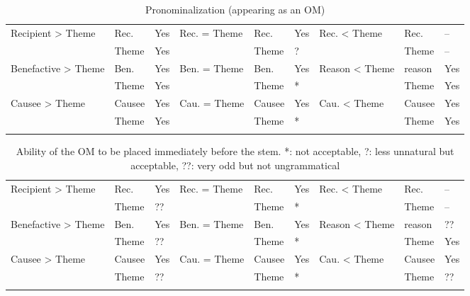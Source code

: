 \documentclass[output=paper,
            colorlinks, citecolor=brown
            ,draftmode
		  ]{langscibook}
\begin{document}
\begin{table}
\small
\begin{tabularx}{\textwidth}{QllQllQll}

\lsptoprule

Recipient > Theme & Rec. & Yes & Rec. = Theme & Rec. & Yes & Rec. < Theme & Rec. & {}--\\
& Theme & Yes &  & Theme & ? &  & Theme & {}--\\
\tablevspace
Benefactive > Theme & Ben. & Yes & Ben. = Theme & Ben. & Yes & Reason < Theme & reason & Yes\\
& Theme & Yes &  & Theme & * &  & Theme & Yes\\
\tablevspace
Causee > Theme & Causee & Yes & Cau. = Theme & Causee & Yes & Cau. < Theme & Causee & Yes\\
& Theme & Yes &  & Theme & * &  & Theme & Yes\\
\lspbottomrule
\end{tabularx}
\caption{Pronominalization (appearing as an OM)}
\label{tab:yoneda:3}
\end{table}

\begin{table}
\small
\begin{tabularx}{\textwidth}{QllQllQll}

\lsptoprule

Recipient > Theme & Rec. & Yes & Rec. = Theme & Rec. & Yes & Rec. < Theme & Rec. & {}--\\
& Theme & ?? &  & Theme & * &  & Theme & {}--\\
\tablevspace
Benefactive > Theme & Ben. & Yes & Ben. = Theme & Ben. & Yes & Reason < Theme & reason & ??\\
& Theme & ?? &  & Theme & * &  & Theme & Yes\\
\tablevspace
Causee > Theme & Causee & Yes & Cau. = Theme & Causee & Yes & Cau. < Theme & Causee & Yes\\
& Theme & ?? &  & Theme & * &  & Theme & ??\\
\lspbottomrule
\end{tabularx}
 \caption{Ability of the OM to be placed immediately before the stem. *: not acceptable,  ?: less unnatural but acceptable,   ??: very odd but not ungrammatical}
\label{tab:yoneda:4}
\end{table}
\end{document}
